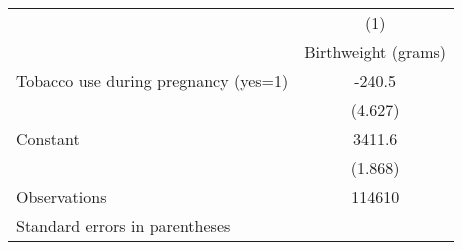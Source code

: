 \begin{tabular}{l*{1}{c}}
\hline\hline
                    &\multicolumn{1}{c}{(1)}\\
                    &\multicolumn{1}{c}{Birthweight (grams)}\\
\hline
Tobacco use during pregnancy (yes=1)&      -240.5\\
                    &     (4.627)\\
[1em]
Constant            &      3411.6\\
                    &     (1.868)\\
\hline
Observations        &      114610\\
\hline\hline
\multicolumn{2}{l}{\footnotesize Standard errors in parentheses}\\
\end{tabular}
